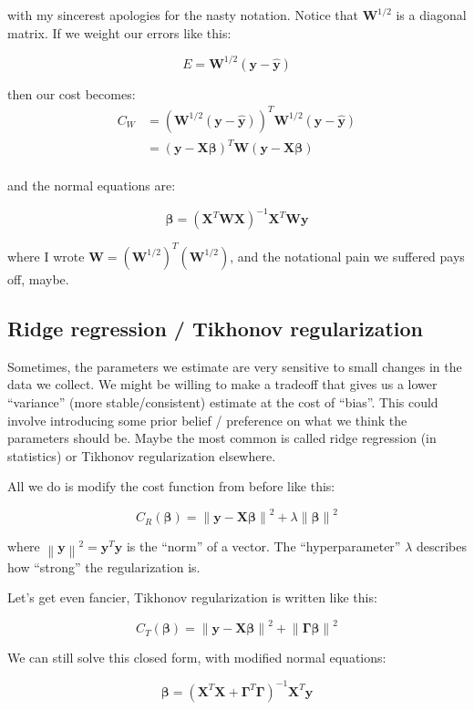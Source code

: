 \documentclass[11pt]{article}
\newcommand\xmtx{\boldsymbol{X}}
\newcommand\betavec{\boldsymbol{\beta}}
\newcommand\wmtx{\boldsymbol{W}}
\newcommand\wmtxsqrt{\wmtx^{1/2}}
\newcommand\yvec{\boldsymbol{y}}
\newcommand\yhatvec{\boldsymbol{\hat{y}}}
\newcommand\gammtx{\boldsymbol{\Gamma}}
\newcommand{\norm}[1]{\left\lVert#1\right\rVert}
\begin{document}
with my sincerest apologies for the nasty notation.
Notice that $\wmtxsqrt$ is a diagonal matrix. If we weight our errors
like this:

\begin{equation}
        E = \wmtxsqrt( \yvec -  \yhatvec )
\end{equation}

then our cost becomes:
\begin{equation}
    \begin{aligned}
        C_W &= (\wmtxsqrt( \yvec -  \yhatvec ))^T \wmtxsqrt( \yvec - \yhatvec ) \\
          &= ( \yvec - \xmtx \betavec )^T \wmtx ( \yvec - \xmtx\betavec ) \\
    \end{aligned}
\end{equation}

and the normal equations are:

\begin{equation}
    \betavec = (\xmtx^T \wmtx \xmtx)^{-1} \xmtx^T \wmtx \yvec
\end{equation}

where I wrote $\wmtx = (\wmtxsqrt)^T(\wmtxsqrt)$, and the notational
pain we suffered pays off, maybe.

\subsection{ Ridge regression / Tikhonov regularization }

Sometimes, the parameters we estimate are very sensitive to small 
changes in the data we collect. We might be willing to make a tradeoff
that gives us a lower ``variance'' (more stable/consistent) estimate at the
cost of ``bias''. This could involve introducing some prior belief / preference
on what we think the parameters should be. Maybe the most common is
called ridge regression (in statistics) or Tikhonov regularization
elsewhere.

All we do is modify the cost function from before like this:

\begin{equation}
  C_{R}(\betavec) =  \norm{ \yvec - \xmtx \betavec }^2 + \lambda\norm{\betavec}^2
\end{equation}

where $\norm{\yvec}^2 = \yvec^T \yvec$ is the ``norm'' of a vector. The
``hyperparameter'' $\lambda$ describes how ``strong'' the regularization
is.

Let's get even fancier, Tikhonov regularization is written like this: 

\begin{equation}
  C_{T}(\betavec) =  \norm{ \yvec - \xmtx \betavec }^2 + \norm{\gammtx\betavec}^2
\end{equation}

We can still solve this closed form, with modified normal equations:

\begin{equation}
    \betavec = (\xmtx^T \xmtx + \gammtx^T \gammtx)^{-1} \xmtx^T \yvec
\end{equation}
\end{document}
